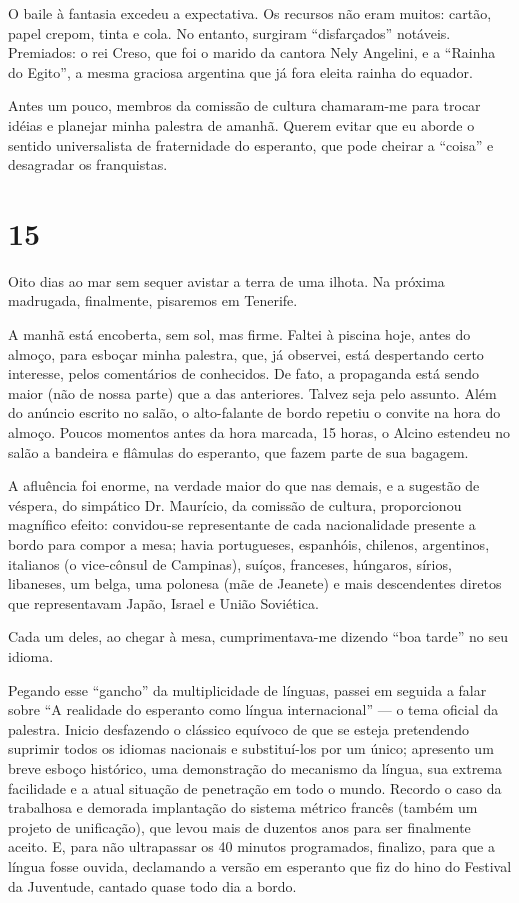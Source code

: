 O baile à fantasia excedeu a expectativa. Os recursos não eram muitos: cartão, papel crepom, tinta e cola. No entanto, surgiram ``disfarçados'' notáveis. Premiados: o rei Creso, que foi o marido da cantora Nely Angelini, e a ``Rainha do Egito'', a mesma graciosa argentina que já fora eleita rainha do equador.

Antes um pouco, membros da comissão de cultura chamaram-me para trocar idéias e planejar minha palestra de amanhã. Querem evitar que eu aborde o sentido universalista de fraternidade do esperanto, que pode cheirar a ``coisa'' e desagradar os franquistas.

\section*{15 \adfflatleafright {}}

Oito dias ao mar sem sequer avistar a terra de uma ilhota. Na próxima madrugada, finalmente, pisaremos em Tenerife.

A manhã está encoberta, sem sol, mas firme. Faltei à piscina hoje, antes do almoço, para esboçar minha palestra, que, já observei, está despertando certo interesse, pelos comentários de conhecidos. De fato, a propaganda está sendo maior (não de nossa parte) que a das anteriores. Talvez seja pelo assunto. Além do anúncio escrito no salão, o alto-falante de bordo repetiu o convite na hora do almoço. Poucos momentos antes da hora marcada, 15 horas, o Alcino estendeu no salão a bandeira e flâmulas do esperanto, que fazem parte de sua bagagem.

A afluência foi enorme, na verdade maior do que nas demais, e a sugestão de véspera, do simpático Dr. Maurício, da comissão de cultura, proporcionou magnífico efeito: convidou-se representante de cada nacionalidade presente a bordo para compor a mesa; havia portugueses, espanhóis, chilenos, argentinos, italianos (o vice-cônsul de Campinas), suíços, franceses, húngaros, sírios, libaneses, um belga, uma polonesa (mãe de Jeanete) e mais descendentes diretos que representavam Japão, Israel e União Soviética.

Cada um deles, ao chegar à mesa, cumprimentava-me dizendo ``boa tarde'' no seu idioma.

Pegando esse ``gancho'' da multiplicidade de línguas, passei em seguida a falar sobre ``A realidade do esperanto como língua internacional'' --- o tema oficial da palestra. Inicio desfazendo o clássico equívoco de que se esteja pretendendo suprimir todos os idiomas nacionais e substituí-los por um único; apresento um breve esboço histórico, uma demonstração do mecanismo da língua, sua extrema facilidade e a atual situação de penetração em todo o mundo. Recordo o caso da trabalhosa e demorada implantação do sistema métrico francês (também um projeto de unificação), que levou mais de duzentos anos para ser finalmente aceito. E, para não ultrapassar os 40 minutos programados, finalizo, para que a língua fosse ouvida, declamando a versão em esperanto que fiz do hino do Festival da Juventude, cantado quase todo dia a bordo.

